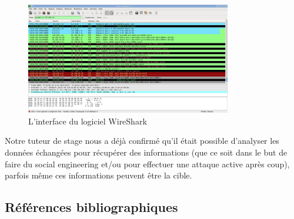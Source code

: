 \documentclass[a4paper, 12pt,twoside]{article}
\begin{document}
		\begin{figure}[!ht]
		\centering
		\includegraphics[width=0.8\textwidth]{wireshark.jpg}
		\caption{L'interface du logiciel WireShark}
		\label{pic:wireshark}
		\end{figure}
		
		Notre tuteur de stage nous a déjà confirmé qu'il était possible d'analyser les données échangées pour récupérer des informations (que ce soit dans le but de faire du social engineering et/ou pour effectuer une attaque active après coup), parfois même ces informations peuvent être la cible.
		
		\clearpage %
		\subsection{Références bibliographiques}
		{
		\renewcommand{\section}[2]{} %
		\nocite{*}
		
		
		}
\end{document}
